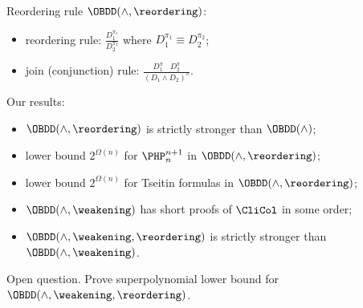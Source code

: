 \begin{frame}{Reordering rule}
    $\OBDD(\land, \reordering)$:
    \begin{itemize}
    	\item reordering rule: $\frac{D_1^{\pi_1}}{D_2^{\pi_2}}$ where $D_1^{\pi_1} \equiv D_2^{\pi_2}$;
        \item join (conjunction) rule: $\frac{D_1^{\pi} ~~~~ D_2^{\pi}}{(D_1 \land D_2)^{\pi}}$.
    \end{itemize}

    \pause
	Our results:
    \pause
    \begin{itemize}
        \item $\OBDD(\land, \reordering)$ is strictly stronger than $\OBDD(\land)$;
        \pause
        \item lower bound $2^{\Omega(n)}$ for $\PHP^{n + 1}_n$ in $\OBDD(\land, \reordering)$;
        \item lower bound $2^{\Omega(n)}$ for Tseitin formulas in $\OBDD(\land, \reordering)$;
        \pause
        \item $\OBDD(\land, \weakening)$ has short proofs of $\CliCol$ in some order;
        \item $\OBDD(\land, \weakening, \reordering)$ is strictly stronger than $\OBDD(\land,
            \weakening)$.
    \end{itemize}

    \pause
    {\color{blue} Open question.} Prove superpolynomial lower bound for $\OBDD(\land, \weakening,
    \reordering)$.
\end{frame}